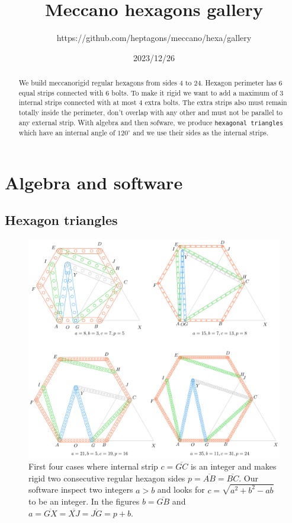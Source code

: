 \documentclass[11pt]{article}
\title{Meccano hexagons gallery}
\author{https://github.com/heptagons/meccano/hexa/gallery}
\date{2023/12/26}
\begin{document}
\maketitle
\begin{abstract}
We build meccano\meccanoref rigid regular hexagons from sides $4$ to $24$. Hexagon perimeter has $6$ equal strips connected with $6$ bolts. To make it rigid we want to add a maximum of $3$ internal strips connected with at most $4$ extra bolts. The extra strips also must remain totally inside the perimeter, don't overlap with any other and must not be parallel to any external strip. With algebra and then sofware, we produce \texttt{hexagonal triangles} which have an internal angle of $120^\circ$ and we use their sides as the internal strips.
\end{abstract}

\section{Algebra and software}

\subsection{Hexagon triangles}

\begin{figure}[h]
\centering
\includegraphics[scale=0.9]{build/hexa-builder-a}
\caption{First four cases where internal strip $c = \overline{GC}$ is an integer and makes rigid two consecutive regular hexagon sides $p = \overline{AB} = \overline{BC}$. Our software inspect two integers $a > b$ and looks for $c = \sqrt{a^2+b^2-ab}$ to be an integer. In the figures $b = \overline{GB}$ and $a = \overline{GX} = \overline{XJ} = \overline{JG} = p + b$. }
\label{fig:builder-a}
\end{figure}
\end{document}
